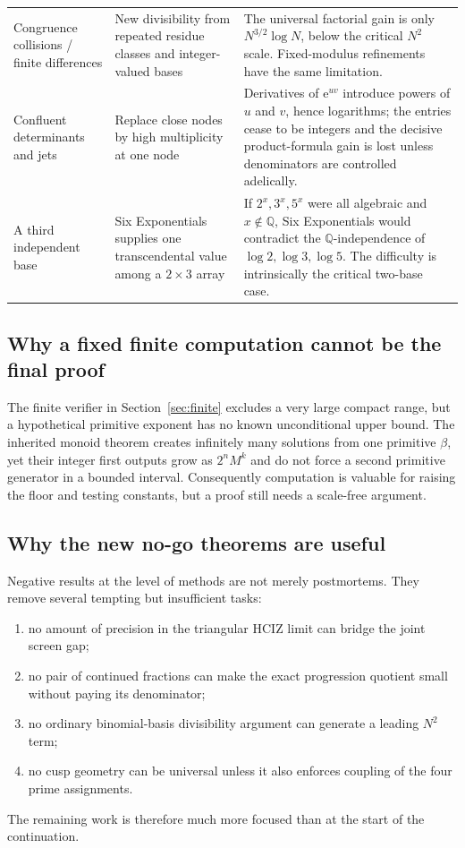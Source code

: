 \documentclass[11pt]{article}
\newcommand{\Q}{\mathbb Q}
\newcommand{\e}{\mathrm e}
\newcommand{\1}{\mathbf 1}
\theoremstyle{plain}
\theoremstyle{definition}
\theoremstyle{remark}
\begin{document}
\begin{longtable}{@{}>{\raggedright\arraybackslash}p{}
>{\raggedright\arraybackslash}p{}
>{\raggedright\arraybackslash}p{}@{}}
Congruence collisions / finite differences
& New divisibility from repeated residue classes and integer-valued bases
& The universal factorial gain is only $N^{3/2}\log N$, below the critical
$N^2$ scale.  Fixed-modulus refinements have the same limitation.\\

Confluent determinants and jets
& Replace close nodes by high multiplicity at one node
& Derivatives of $\e^{uv}$ introduce powers of $u$ and $v$, hence logarithms;
the entries cease to be integers and the decisive product-formula gain is
lost unless denominators are controlled adelically.\\

A third independent base
& Six Exponentials supplies one transcendental value among a $2\times3$
array
& If $2^x,3^x,5^x$ were all algebraic and $x\notin\Q$, Six Exponentials would
contradict the $\Q$-independence of $\log2,\log3,\log5$.  The difficulty is
intrinsically the critical two-base case.\\
\bottomrule
\end{longtable}
\addtocounter{table}{-1}
\endgroup

\subsection{Why a fixed finite computation cannot be the final proof}

The finite verifier in Section~\ref{sec:finite} excludes a very large compact
range, but a hypothetical primitive exponent has no known unconditional
upper bound.  The inherited monoid theorem creates infinitely many solutions
from one primitive $\beta$, yet their integer first outputs grow as
$2^nM^k$ and do not force a second primitive generator in a bounded interval.
Consequently computation is valuable for raising the floor and testing
constants, but a proof still needs a scale-free argument.

\subsection{Why the new no-go theorems are useful}

Negative results at the level of methods are not merely postmortems.  They
remove several tempting but insufficient tasks:
\begin{enumerate}[leftmargin=2.2em]
\item no amount of precision in the triangular HCIZ limit can bridge the
joint screen gap;
\item no pair of continued fractions can make the exact progression quotient
small without paying its denominator;
\item no ordinary binomial-basis divisibility argument can generate a leading
$N^2$ term;
\item no cusp geometry can be universal unless it also enforces coupling of
the four prime assignments.
\end{enumerate}
The remaining work is therefore much more focused than at the start of the
continuation.
\end{document}
